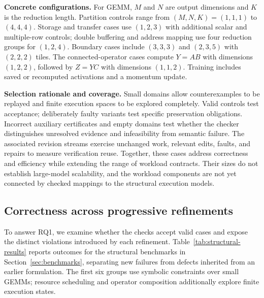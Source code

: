 \documentclass[11pt]{article}
\begin{document}
\textbf{Concrete configurations.}
For GEMM, $M$ and $N$ are output dimensions and $K$ is the reduction length. Partition controls range from $(M,N,K)=(1,1,1)$ to $(4,4,4)$. Storage and transfer cases use $(1,2,3)$ with additional scalar and multiple-row controls; double buffering and address mapping use four reduction groups for $(1,2,4)$. Boundary cases include $(3,3,3)$ and $(2,3,5)$ with $(2,2,2)$ tiles. The connected-operator cases compute $Y=AB$ with dimensions $(1,2,2)$, followed by $Z=YC$ with dimensions $(1,1,2)$. Training includes saved or recomputed activations and a momentum update.

\textbf{Selection rationale and coverage.}
Small domains allow counterexamples to be replayed and finite execution spaces to be explored completely. Valid controls test acceptance; deliberately faulty variants test specific preservation obligations. Incorrect auxiliary certificates and empty domains test whether the checker distinguishes unresolved evidence and infeasibility from semantic failure. The associated revision streams exercise unchanged work, relevant edits, faults, and repairs to measure verification reuse. Together, these cases address correctness and efficiency while extending the range of workload contracts. Their sizes do not establish large-model scalability, and the workload components are not yet connected by checked mappings to the structural execution models.

\subsection{Correctness across progressive refinements}\label{sec:pilot}\label{sec:storage-pilot}\label{sec:transfer-pilots}\label{sec:structural-pilots}
To answer RQ1, we examine whether the checks accept valid cases and expose the distinct violations introduced by each refinement. Table~\ref{tab:structural-results} reports outcomes for the structural benchmarks in Section~\ref{sec:benchmarks}, separating new failures from defects inherited from an earlier formulation. The first six groups use symbolic constraints over small GEMMs; resource scheduling and operator composition additionally explore finite execution states.
\end{document}
